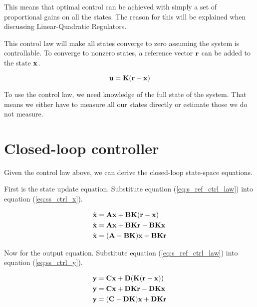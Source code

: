 This means that optimal control can be achieved with simply a set of
proportional gains on all the states. The reason for this will be explained when
discussing Linear-Quadratic Regulators.

This \gls{control law} will make all states converge to zero assuming the system
is controllable. To converge to nonzero states, a reference vector $\mathbf{r}$ can
be added to the state $\mathbf{x}$.

\begin{theorem}
  \begin{equation}
    \mathbf{u} = \mathbf{K}(\mathbf{r} - \mathbf{x}) \label{eq:s_ref_ctrl_law}
  \end{equation}
\end{theorem}

To use the control law, we need knowledge of the full state of the system. That
means we either have to measure all our states directly or estimate those we do
not measure.

\section{Closed-loop controller}

Given the \gls{control law} above, we can derive the closed-loop state-space
equations.

First is the state update equation. Substitute equation
(\ref{eq:s_ref_ctrl_law}) into equation (\ref{eq:ss_ctrl_x}).

\begin{align}
  \dot{\mathbf{x}} &= \mathbf{A}\mathbf{x} + \mathbf{B}\mathbf{K}(\mathbf{r} - \mathbf{x}) \nonumber
    \\
  \dot{\mathbf{x}} &= \mathbf{A}\mathbf{x} + \mathbf{B}\mathbf{K}\mathbf{r} -
    \mathbf{B}\mathbf{K}\mathbf{x} \nonumber \\
  \dot{\mathbf{x}} &= (\mathbf{A} - \mathbf{B}\mathbf{K})\mathbf{x} + \mathbf{B}\mathbf{K}\mathbf{r}
\end{align}

Now for the output equation. Substitute equation (\ref{eq:s_ref_ctrl_law}) into
equation (\ref{eq:ss_ctrl_y}).

\begin{align}
  \mathbf{y} &= \mathbf{C}\mathbf{x} + \mathbf{D}(\mathbf{K}(\mathbf{r} - \mathbf{x})) \nonumber \\
  \mathbf{y} &= \mathbf{C}\mathbf{x} + \mathbf{D}\mathbf{K}\mathbf{r} - \mathbf{D}\mathbf{K}\mathbf{x}
    \nonumber \\
  \mathbf{y} &= (\mathbf{C} - \mathbf{D}\mathbf{K})\mathbf{x} + \mathbf{D}\mathbf{K}\mathbf{r}
\end{align}

